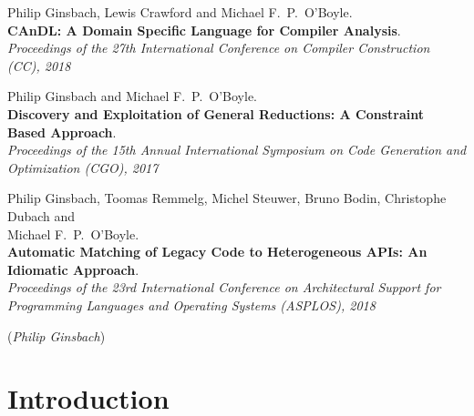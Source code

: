 \documentclass[phd,icsa,twoside,logo,11pt]{infthesis}
\begin{document}
\begin{preliminary}
\begin{declaration}
    \begin{description}
    \small
        \item[\hspace{0.35cm}\citep{Ginsbach:2018:CDS:3178372.3179515}]
              Philip Ginsbach, Lewis Crawford and Michael F.\ P.\ O'Boyle.\\
              {\bf CAnDL: A Domain Specific Language for Compiler Analysis}.\\
              {\em Proceedings of the 27th International Conference on
               Compiler Construction (CC), 2018}
        \item[\hspace{0.35cm}\citep{ginsbach2017discovery}]
              Philip Ginsbach and Michael F.\ P.\ O'Boyle.\\
              {\bf Discovery and Exploitation of General Reductions: A
              Constraint Based Approach}.\\
              {\em Proceedings of the 15th Annual International
               Symposium on Code Generation and\\Optimization (CGO), 2017}
        \item[\hspace{0.35cm}\citep{Ginsbach:2018:AML:3173162.3173182}]
              Philip Ginsbach, Toomas Remmelg, Michel Steuwer, Bruno Bodin,
              Christophe Dubach and\\Michael F.\ P.\ O'Boyle.\\
              {\bf Automatic Matching of Legacy Code to Heterogeneous APIs: An
              Idiomatic Approach}.\\
              {\em Proceedings of the 23rd International Conference on
               Architectural Support for\\Programming Languages and Operating
               Systems (ASPLOS), 2018}
    \end{description}

    \par
\vspace{1in}\raggedleft({\em Philip Ginsbach})
\end{declaration}
\tableofcontents
\end{preliminary}
\chapter{Introduction}
    \label{chapter:introduction}
    

\makeatletter
\@openrightfalse
\makeatother
\end{document}
